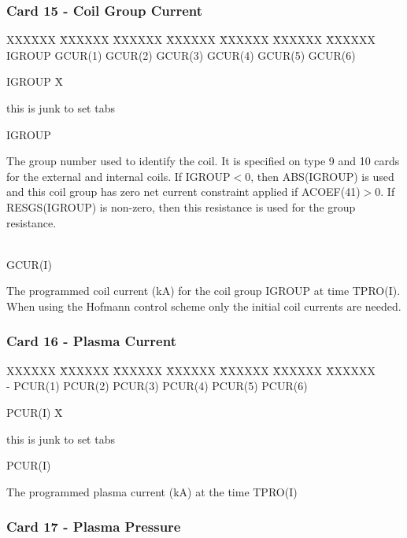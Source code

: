 \newpage \subsubsection{Card 15 - Coil Group Current}
\begin{tabbing}
XXXXXX \= XXXXXX \= XXXXXX \= XXXXXX \= XXXXXX \= XXXXXX \=
XXXXXX       \\
\footnotesize IGROUP \>\footnotesize GCUR(1)  \>\footnotesize GCUR(2) \>\footnotesize
GCUR(3) \>\footnotesize GCUR(4) \>\footnotesize GCUR(5) \>\footnotesize GCUR(6)
\end{tabbing}
\begin{tabbing}
IGROUP  X\= \parbox[t]{\width}{this is junk to set tabs} \kill
IGROUP \> \parbox[t]{\width}{The group number used to identify the coil. It is specified on type
9 and 10 cards for the external and internal coils.  If IGROUP$<$0, then ABS(IGROUP) is used
and this coil group has zero net current constraint applied if ACOEF(41)$>$0.  If
RESGS(IGROUP)
is non-zero, then this resistance is used for the group resistance.}\\
GCUR(I) \> \parbox[t]{\width}{The programmed coil current (kA) for the coil group IGROUP
at
time TPRO(I).  When using the Hofmann control scheme only the initial coil currents are
needed.}
\end{tabbing}
\pagebreak
\newpage \subsubsection{Card 16 - Plasma Current}
\begin{tabbing}
XXXXXX \= XXXXXX \= XXXXXX \= XXXXXX \= XXXXXX \= XXXXXX \=
XXXXXX       \\
\footnotesize  -  \>\footnotesize PCUR(1)  \>\footnotesize PCUR(2) \>\footnotesize PCUR(3)
\>\footnotesize PCUR(4)  \>\footnotesize PCUR(5) \>\footnotesize PCUR(6)
\end{tabbing}
\begin{tabbing}
PCUR(I) X\= \parbox[t]{\width}{this is junk to set tabs} \kill
PCUR(I) \> \parbox[t]{\width}{The programmed plasma current (kA) at the time TPRO(I)}
\end{tabbing}
\newpage \subsubsection{Card 17 - Plasma Pressure}
